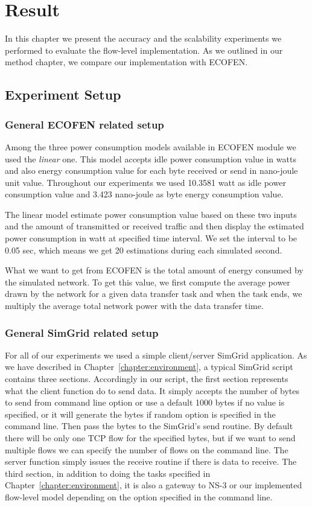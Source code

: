\chapter{Result}
\label{chapter:evaluation}
In this chapter we present the accuracy and the scalability experiments we performed to evaluate the flow-level implementation. As we outlined in our method chapter, we compare our implementation with ECOFEN.  
\section{Experiment Setup}

\subsection{General ECOFEN related setup}
Among the three power consumption models available in ECOFEN module we used the \emph{linear} one. This model accepts idle power consumption value in watts and also energy consumption value for each byte received or send in nano-joule unit value. Throughout our experiments we used 10.3581 watt as idle power consumption value and 3.423 nano-joule as byte energy consumption value. 

The linear model estimate power consumption value based on these two inputs and the amount of transmitted or received traffic and then display the estimated power consumption in watt at specified time interval. We set the interval to be 0.05 sec, which means we get 20 estimations during each simulated second. 

What we want to get from ECOFEN is the total amount of energy consumed by the simulated network. To get this value, we first compute the average power drawn by the network for a given data transfer task and when the task ends, we multiply the average total network power with the data transfer time. 

\subsection{General SimGrid related setup}
For all of our experiments we used a simple client/server SimGrid application. As we have described in Chapter~\ref{chapter:environment}, a typical SimGrid script contains three sections. Accordingly in our script, the first section represents what the client function do to send data. It simply accepts the number of bytes to send from command line option or use a default 1000 bytes if no value is specified, or it will generate the bytes if random option is specified in the command line. Then pass the bytes to the SimGrid's send routine. By default there will be only one TCP flow for the specified bytes, but if we want to send multiple flows we can specify the number of flows on the command line. The server function simply issues the receive routine if there is data to receive. The third section, in addition to doing the tasks specified in Chapter~\ref{chapter:environment},  it is also a gateway to NS-3 or our implemented flow-level model depending on the option specified in the command line. 

